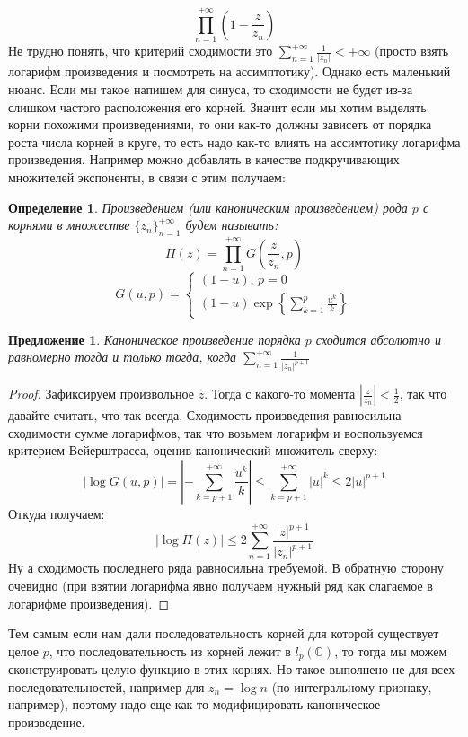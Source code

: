 \documentclass[12pt,a4paper]{article} %
\newtheorem{definition}{Определение}
\newtheorem{proposition}{Предложение}
\newcommand{\Co}{\mathbb{C}}
\begin{document}
	$$\prod_{n=1}^{+\infty}\left(1-\frac{z}{z_n}\right)$$
	Не трудно понять, что критерий сходимости это $\displaystyle\sum_{n=1}^{+\infty}\frac{1}{|z_n|}<+\infty$ (просто взять логарифм произведения и посмотреть на ассимптотику). Однако есть маленький нюанс. Если мы такое напишем для синуса, то сходимости не будет из-за слишком частого расположения его корней. Значит если мы хотим выделять корни похожими произведениями, то они как-то должны зависеть от порядка роста числа корней в круге, то есть надо как-то влиять на ассимтотику логарифма произведения. Например можно добавлять в качестве подкручивающих множителей экспоненты, в связи с этим получаем:
	\begin{definition}
		Произведением (или каноническим произведением) рода $p$ с корнями в множестве $\{z_n\}_{n=1}^{+\infty}$ будем называть:
		$$\Pi(z)=\prod_{n=1}^{+\infty}G\left(\frac{z}{z_n},p\right)$$
		\begin{equation*}
			G\left(u,p\right)=
			\begin{cases}
				(1-u),\, p=0\\
				(1-u)\exp\left\{\displaystyle\sum_{k=1}^p\frac{u^k}{k}\right\}
			\end{cases}
		\end{equation*}
	\end{definition}
	\begin{proposition}
		Каноническое произведение порядка $p$ сходится абсолютно и равномерно тогда и только тогда, когда $\displaystyle\sum_{n=1}^{+\infty}\frac{1}{|z_n|^{p+1}}$
	\end{proposition}
	\begin{proof}
		Зафиксируем произвольное $z$. Тогда с какого-то момента $\left|\frac{z}{z_n}\right|<\frac{1}{2}$, так что давайте считать, что так всегда. Сходимость произведения равносильна сходимости сумме логарифмов, так что возьмем логарифм и воспользуемся критерием Вейерштрасса, оценив канонический множитель сверху:
		$$\left|\log G(u,p)\right|=\left|-\sum_{k=p+1}^{+\infty}\frac{u^k}{k}\right|\leq\sum_{k=p+1}^{+\infty}|u|^k\leq2|u|^{p+1}$$
		Откуда получаем:
		$$\left|\log\Pi(z)\right|\leq2\sum_{n=1}^{+\infty}\frac{|z|^{p+1}}{|z_n|^{p+1}}$$
		Ну а сходимость последнего ряда равносильна требуемой. В обратную сторону очевидно (при взятии логарифма явно получаем нужный ряд как слагаемое в логарифме произведения).
	\end{proof}
	Тем самым если нам дали последовательность корней для которой существует целое $p$, что последовательность из корней лежит в $l_{p}(\Co)$, то тогда мы можем сконструировать целую функцию в этих корнях. Но такое выполнено не для всех последовательностей, например для $z_n=\log n$ (по интегральному признаку, например), поэтому надо еще как-то модифицировать каноническое произведение.
\end{document}
